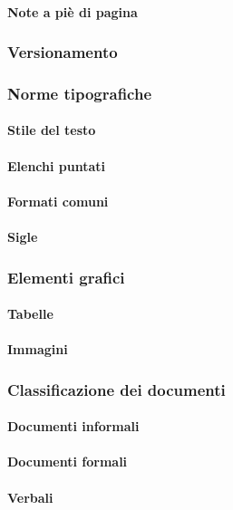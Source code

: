 		\paragraph{Note a piè di pagina}
	\subsubsection{Versionamento}
	\subsubsection{Norme tipografiche}
		\paragraph{Stile del testo}
		\paragraph{Elenchi puntati}
		\paragraph{Formati comuni}
		\paragraph{Sigle}
	\subsubsection{Elementi grafici}
		\paragraph{Tabelle}
		\paragraph{Immagini}
	\subsubsection{Classificazione dei documenti}
		\paragraph{Documenti informali}
		\paragraph{Documenti formali}
		\paragraph{Verbali}
